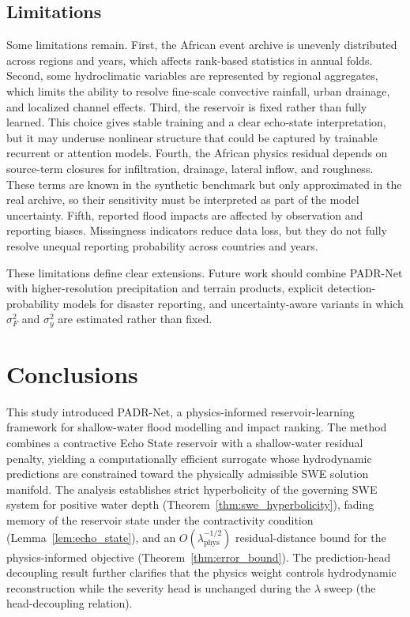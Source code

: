 \documentclass[pdflatex,sn-mathphys-ay]{sn-jnl}
\theoremstyle{thmstyleone}
\begin{document}
\subsection{Limitations}

Some limitations remain.  First, the African event archive is unevenly distributed across regions and years,
which affects rank-based statistics in annual folds.  Second, some
hydroclimatic variables are represented by regional aggregates, which
limits the ability to resolve fine-scale convective rainfall, urban
drainage, and localized channel effects.  Third, the reservoir is fixed
rather than fully learned.  This choice gives stable training and a
clear echo-state interpretation, but it may underuse nonlinear
structure that could be captured by trainable recurrent or attention
models.  Fourth, the African physics residual depends on source-term closures
for infiltration, drainage, lateral inflow, and roughness.  These terms
are known in the synthetic benchmark but only approximated in the real
archive, so their sensitivity must be interpreted as part of the model
uncertainty.  Fifth, reported flood impacts are affected by observation
and reporting biases.  Missingness indicators reduce data loss, but
they do not fully resolve unequal reporting probability across countries
and years.

These limitations define clear extensions.  Future work should combine
PADR-Net with higher-resolution precipitation and terrain products,
explicit detection-probability models for disaster reporting, and
uncertainty-aware variants in which $\sigma_F^2$ and $\sigma_y^2$ are
estimated rather than fixed. 

\section{Conclusions}
\label{sec:conclusions}

This study introduced PADR-Net, a physics-informed reservoir-learning
framework for shallow-water flood modelling and impact ranking.  The
method combines a contractive Echo State reservoir with a
shallow-water residual penalty, yielding a computationally efficient
surrogate whose hydrodynamic predictions are constrained toward the
physically admissible SWE solution manifold.  The  analysis
establishes strict hyperbolicity of the governing SWE system for
positive water depth (Theorem~\ref{thm:swe_hyperbolicity}), fading
memory of the reservoir state under the contractivity condition
(Lemma~\ref{lem:echo_state}), and an
$O(\lambda_{\mathrm{phys}}^{-1/2})$ residual-distance bound for the
physics-informed objective (Theorem~\ref{thm:error_bound}).  The
prediction-head decoupling result further clarifies that the physics
weight controls hydrodynamic reconstruction while the severity head is
unchanged during the $\lambda$ sweep
(the head-decoupling relation).
\end{document}
